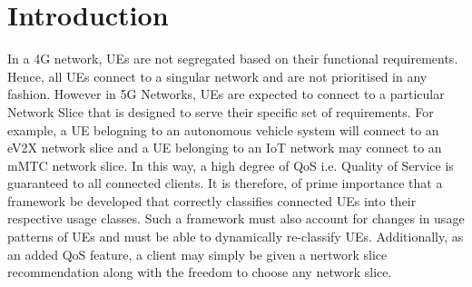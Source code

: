 \documentclass[conference]{IEEEtran}
\begin{document}
\section{Introduction}
In a 4G network, UEs are not segregated based on their functional requirements. Hence, all UEs connect to a singular network and are not prioritised in any fashion. However in 5G Networks, UEs are expected to connect to a particular Network Slice that is designed to serve their specific set of requirements. For example, a UE belogning to an autonomous vehicle system will connect to an eV2X network slice and a UE belonging to an IoT network may connect to an mMTC network slice. In this way, a high degree of QoS i.e. Quality of Service is guaranteed to all connected clients. It is therefore, of prime importance that a framework be developed that correctly classifies connected UEs into their respective usage classes. Such a framework must also account for changes in usage patterns of UEs and  must be able to dynamically re-classify UEs. Additionally, as an added QoS feature, a client may simply be given a nertwork slice recommendation along with the freedom to choose any network slice.
\end{document}
